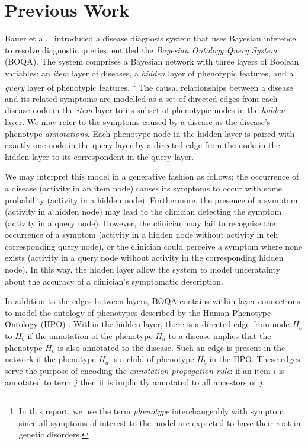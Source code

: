 \section{Previous Work}
\label{sec:lit-rev}

Bauer et al.\ \cite{bauer2012bayesian} introduced a disease diagnosis system
that uses Bayesian inference to resolve diagnostic queries, entitled the 
{\it Bayesian Ontology Query System} (BOQA).
%
The system comprises a Bayesian network with three layers of Boolean variables:
an {\it item} layer of diseases, a {\it hidden} layer of phenotypic features,
and a {\it query} layer of phenotypic features.
%
\footnote{
    In this report, we use the term {\it phenotype} interchangeably with symptom,
    since all symptoms of interest to the model are expected to have their root
    in genetic disorders.
}
%
The causal relationships between a disease and its related symptoms are modelled
as a set of directed edges from each disease node in the {\it item} layer to its
subset of phenotypic nodes in the {\it hidden} layer.
%
We may refer to the symptoms caused by a disease as the disease's phenotype {\it
annotations}.
%
Each phenotype node in the hidden layer is paired with exactly one node in the
query layer by a directed edge from the node in the hidden layer to its
correspondent in the query layer.

We may interpret this model in a generative fashion as follows:
%
the occurrence of a disease (activity in an item node) causes its symptoms to
occur with some probability (activity in a hidden node). Furthermore, the
presence of a symptom (activity in a hidden node) may lead to the clinician
detecting the symptom (activity in a query node). However, the clinician may
fail to recognise the occurrence of a symptom (activity in a hidden node without
activity in teh corresponding query node), or the clinician could perceive a
symptom where none exists (activity in a query node without
activity in the corresponding hidden node).
%
In this way, the hidden layer allow the system to model unceratainty about the
accuracy of a clinician's symptomatic description.

In addition to the edges between layers, BOQA contains within-layer connections
to model the ontology of phenotypes described by the Human Phenotype Ontology
(HPO) \cite{kohler2014hpo}.
%
Within the hidden layer, there is a directed edge from node $H_a$ to $H_b$
if the annotation of the phenotype $H_a$ to a disease implies that the phenotype
$H_b$ is also annotated to the disease.
%
Such an edge is present in the network if the phenotype $H_a$ is a child of
phenotype $H_b$ in the HPO. 
%
These edges serve the purpose of encoding the {\it annotation propagation rule}:
if an item $i$ is annotated to term $j$ then it is implicitly annotated to all
ancestors of $j$.


